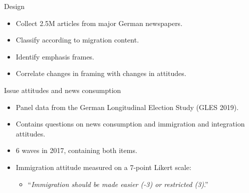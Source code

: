 \documentclass[
  ignorenonframetext,
]{beamer}
\providecommand{\tightlist}{%
  \setlength{\itemsep}{0pt}\setlength{\parskip}{0pt}}
\begin{document}
\begin{frame}{Design}
\protect\hypertarget{design}{}
\begin{itemize}
\tightlist
\item
  Collect 2.5M articles from major German newspapers.
\item
  Classify according to migration content.
\item
  Identify emphasis frames.
\item
  Correlate changes in framing with changes in attitudes.
\end{itemize}
\end{frame}

\begin{frame}[allowframebreaks]{Issue attitudes and news consumption}
\protect\hypertarget{issue-attitudes-and-news-consumption}{}
\begin{itemize}
\tightlist
\item
  Panel data from the German Longitudinal Election Study (GLES 2019).
\item
  Contains questions on news consumption and immigration and integration
  attitudes.
\item
  6 waves in 2017, containing both items.
\item
  Immigration attitude measured on a 7-point Likert scale:

  \begin{itemize}
  \tightlist
  \item
    ``\emph{Immigration should be made easier (-3) or restricted (3)}.''
  \end{itemize}
\end{itemize}
\end{frame}
\end{document}
